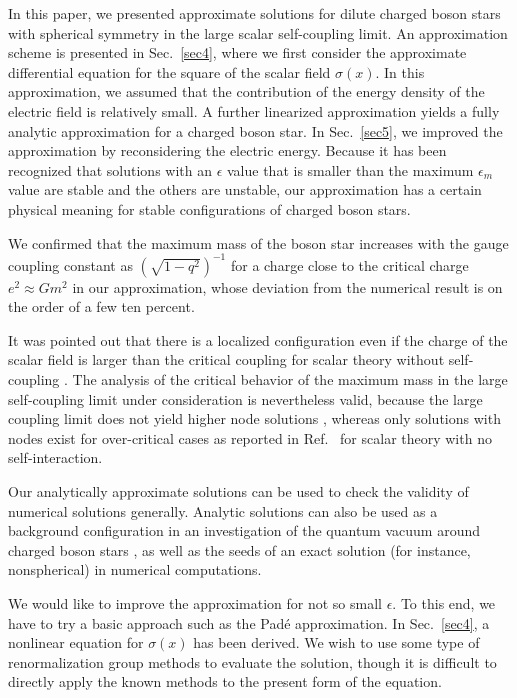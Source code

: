 \documentclass[
aps,prd,
12pt,%
nopreprintnumbers,
showpacs,
eqsecnum,
nofootinbib
]{revtex4-1}
\begin{document}
In this paper, we presented  approximate solutions for
dilute charged boson stars with spherical symmetry in the large scalar
self-coupling limit. 
An approximation scheme is presented in Sec.~\ref{sec4}, where
we first consider the approximate differential equation for the square of the
scalar field $\sigma(x)$. In this approximation, we assumed that the contribution
of the energy density of the electric field is relatively small. A further
linearized approximation yields a fully analytic approximation for a charged
boson star. In Sec.~\ref{sec5}, we improved the approximation by reconsidering the
electric energy.
Because it has been recognized that solutions with an $\epsilon$ value that
is smaller than the maximum
$\epsilon_m$ value are stable and the others are unstable,
our approximation has a certain physical meaning for stable configurations of
charged boson stars.

We confirmed that the maximum mass of the boson star increases with the gauge
coupling constant as
$(\sqrt{1-q^2})^{-1}$ for a charge close to the critical charge $e^2\approx
Gm^2$ in our approximation, whose deviation from the numerical result is on
the order of a few ten percent.

It was pointed out that there is a localized configuration even if the
charge of the scalar field is larger than the critical coupling for
scalar theory without self-coupling \cite{PQRR}.
The analysis of the critical behavior of the maximum mass in the large
self-coupling limit under consideration is nevertheless valid, because the large
coupling limit does not yield higher node solutions \cite{Jetzer}, whereas only
solutions with nodes exist for over-critical cases as reported in Ref.~\cite{PQRR}
for scalar theory with no self-interaction.

Our analytically approximate solutions can be used to check the validity of
numerical solutions generally. Analytic solutions can also be used as a background
configuration in an investigation of the quantum vacuum around charged boson stars
\cite{JLS}, as well as the seeds of an exact solution (for instance, nonspherical)
in numerical computations.

We would like to improve the approximation for not so small $\epsilon$.
To this end, we have to try a basic approach such as the Pad\'e approximation.
In Sec.~\ref{sec4}, a nonlinear equation for $\sigma(x)$ has been derived.
We wish to use some type of renormalization group methods
\cite{CGO1,CGO2,BB1,BB2} to evaluate the solution, though it is difficult to
directly apply the known methods to the present form of the equation.
\end{document}

